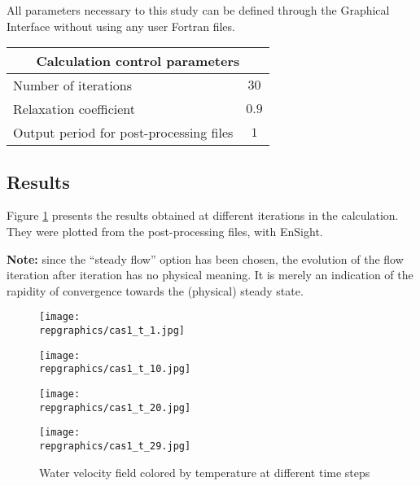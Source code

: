 All parameters necessary to this study can be defined through the Graphical
Interface without using any user Fortran files.

\begin{center}
\begin{tabular}{|l|c|}
\hline
\multicolumn{2}{|c|}{Calculation control parameters} \\
\hline
Number of iterations & $30$ \\
\hline
Relaxation coefficient & $0.9$ \\
\hline
Output period for post-processing files& $1$ \\
\hline
\end{tabular}
\end{center}



	\subsection{Results}

Figure \ref{fige1_e1} presents the results obtained at different iterations in the
calculation. They were plotted from the post-processing files, with EnSight.

\textbf{Note:} since the ``steady flow'' option has been chosen, the evolution
of the flow iteration after iteration has no physical meaning. It is merely an
indication of the rapidity of convergence towards the (physical) steady state.

\begin{figure}[h]
\parbox{0.5\textwidth}{%
\texttt{[image: \\repgraphics/cas1\_t\_1.jpg]}}
\parbox{0.5\textwidth}{%
\texttt{[image: \\repgraphics/cas1\_t\_10.jpg]}}
\vspace*{0.5cm}
\parbox{0.5\textwidth}{%
\texttt{[image: \\repgraphics/cas1\_t\_20.jpg]}}
\parbox{0.5\textwidth}{%
\texttt{[image: \\repgraphics/cas1\_t\_29.jpg]}}
\caption{\label{fige1_e1}Water velocity field colored by temperature at different time steps}
\end{figure}


